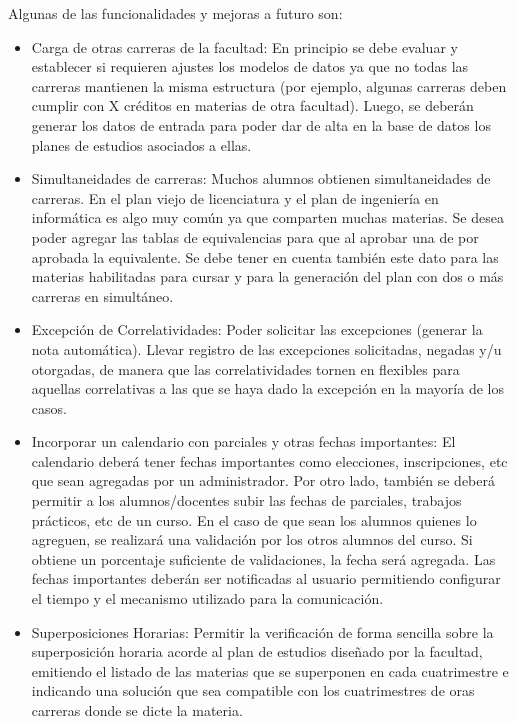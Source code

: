 \documentclass[a4paper]{article}
\begin{document}
Algunas de las funcionalidades y mejoras a futuro son:

\begin{itemize}
	\item Carga de otras carreras de la facultad: En principio se debe evaluar y establecer si requieren ajustes los modelos de datos ya que no todas las carreras mantienen la misma estructura (por ejemplo, algunas carreras deben cumplir con X créditos en materias de otra facultad). Luego, se deberán generar los datos de entrada para poder dar de alta en la base de datos los planes de estudios asociados a ellas.
	
	\item Simultaneidades de carreras: Muchos alumnos obtienen simultaneidades de carreras. En el plan viejo de licenciatura y el plan de ingeniería en informática es algo muy común ya que comparten muchas materias. Se desea poder agregar las tablas de equivalencias para que al aprobar una de por aprobada la equivalente. Se debe tener en cuenta también este dato para las materias habilitadas para cursar y para la generación del plan con dos o más carreras en simultáneo.
	
	\item Excepción de Correlatividades: Poder solicitar las excepciones (generar la nota automática). Llevar registro de las excepciones solicitadas, negadas y/u otorgadas, de manera que las correlatividades tornen en flexibles para aquellas correlativas a las que se haya dado la excepción en la mayoría de los casos.
	
	\item Incorporar un calendario con parciales y otras fechas importantes: El calendario deberá tener fechas importantes como elecciones, inscripciones, etc que sean agregadas por un administrador. Por otro lado, también se deberá permitir a los alumnos/docentes subir las fechas de parciales, trabajos prácticos, etc de un curso. En el caso de que sean los alumnos quienes lo agreguen, se realizará una validación por los otros alumnos del curso. Si obtiene un porcentaje suficiente de validaciones, la fecha será agregada. Las fechas importantes deberán ser notificadas al usuario permitiendo configurar el tiempo y el mecanismo utilizado para la comunicación.
	
	\item Superposiciones Horarias: Permitir la verificación de forma sencilla sobre la superposición horaria acorde al plan de estudios diseñado por la facultad, emitiendo el listado de las materias que se superponen en cada cuatrimestre e indicando una solución que sea compatible con los cuatrimestres de oras carreras donde se dicte la materia.
	

\end{itemize}
\end{document}
